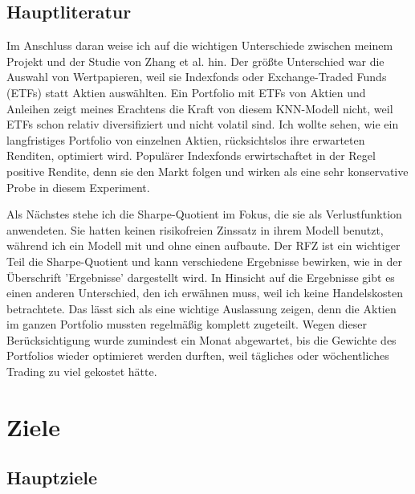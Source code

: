\documentclass[12pt]{article}
\begin{document}
        \subsection{Hauptliteratur}
        
            Im Anschluss daran weise ich auf die wichtigen Unterschiede zwischen meinem Projekt 
            und der Studie von Zhang et al. \cite{zhang2020} hin. 
            Der größte Unterschied war die Auswahl von Wertpapieren, 
            weil sie Indexfonds oder Exchange-Traded Funds (ETFs) statt Aktien auswählten. 
            Ein Portfolio mit ETFs von Aktien und Anleihen zeigt meines Erachtens die Kraft von diesem KNN-Modell nicht, 
            weil ETFs schon relativ diversifiziert und nicht volatil sind. 
            Ich wollte sehen, wie ein langfristiges Portfolio von einzelnen Aktien, 
            rücksichtslos ihre erwarteten Renditen, optimiert wird. Populärer Indexfonds erwirtschaftet in der Regel 
            positive Rendite, denn sie den Markt folgen und wirken als eine sehr konservative Probe in diesem Experiment.

            Als Nächstes stehe ich die Sharpe-Quotient im Fokus, die sie als Verlustfunktion anwendeten. 
            Sie hatten keinen risikofreien Zinssatz in ihrem Modell benutzt, während ich ein Modell mit und ohne einen aufbaute. 
            Der RFZ ist ein wichtiger Teil die Sharpe-Quotient und kann verschiedene Ergebnisse bewirken, 
            wie in der Überschrift 'Ergebnisse' dargestellt wird. In Hinsicht auf die Ergebnisse gibt es einen anderen Unterschied, 
            den ich erwähnen muss, weil ich keine Handelskosten betrachtete. Das lässt sich als eine wichtige Auslassung zeigen, 
            denn die Aktien im ganzen Portfolio mussten regelmäßig komplett zugeteilt. 
            Wegen dieser Berücksichtigung wurde zumindest ein Monat abgewartet, 
            bis die Gewichte des Portfolios wieder optimieret werden durften, 
            weil tägliches oder wöchentliches Trading zu viel gekostet hätte. 

    \newpage \section{Ziele}
    
        \subsection{Hauptziele}
        
\end{document}
